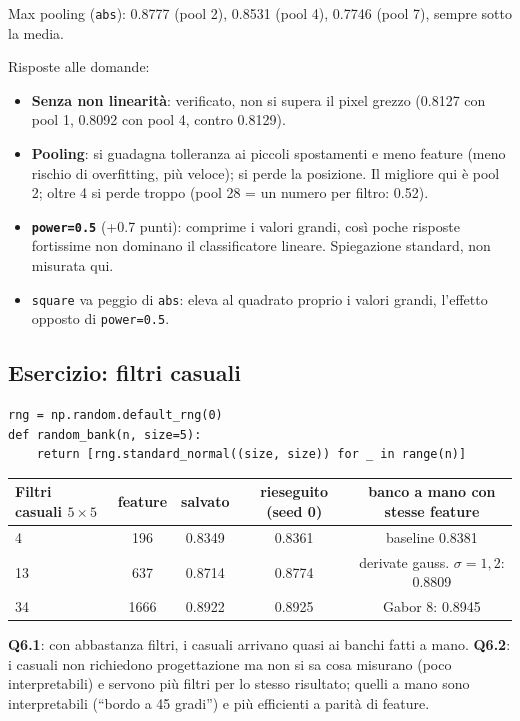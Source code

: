 \documentclass[11pt,a4paper]{article}
\newcommand{\code}[1]{\texttt{#1}}
\begin{document}
Max pooling (\code{abs}): 0.8777 (pool 2), 0.8531 (pool 4), 0.7746 (pool 7), sempre sotto la media.

Risposte alle domande:
\begin{itemize}
  \item \textbf{Senza non linearità}: verificato, non si supera il pixel grezzo (0.8127 con pool 1, 0.8092 con pool 4, contro 0.8129).
  \item \textbf{Pooling}: si guadagna tolleranza ai piccoli spostamenti e meno feature (meno rischio di overfitting, più veloce); si perde la posizione. Il migliore qui è pool 2; oltre 4 si perde troppo (pool 28 = un numero per filtro: 0.52).
  \item \textbf{\code{power=0.5}} (+0.7 punti): comprime i valori grandi, così poche risposte fortissime non dominano il classificatore lineare. Spiegazione standard, non misurata qui.
  \item \code{square} va peggio di \code{abs}: eleva al quadrato proprio i valori grandi, l'effetto opposto di \code{power=0.5}.
\end{itemize}

\subsection{Esercizio: filtri casuali}

\begin{soluzione}
\begin{Verbatim}
rng = np.random.default_rng(0)
def random_bank(n, size=5):
    return [rng.standard_normal((size, size)) for _ in range(n)]
\end{Verbatim}
\end{soluzione}

\begin{center}
\begin{tabular}{@{}lcccc@{}}
\toprule
Filtri casuali $5 \times 5$ & feature & salvato & rieseguito (seed 0) & banco a mano con stesse feature \\
\midrule
4 & 196 & 0.8349 & 0.8361 & baseline 0.8381 \\
13 & 637 & 0.8714 & 0.8774 & derivate gauss. $\sigma = 1,2$: 0.8809 \\
34 & 1666 & 0.8922 & 0.8925 & Gabor 8: 0.8945 \\
\bottomrule
\end{tabular}
\end{center}

\textbf{Q6.1}: con abbastanza filtri, i casuali arrivano quasi ai banchi fatti a mano. \textbf{Q6.2}: i casuali non richiedono progettazione ma non si sa cosa misurano (poco interpretabili) e servono più filtri per lo stesso risultato; quelli a mano sono interpretabili (``bordo a 45 gradi'') e più efficienti a parità di feature.
\end{document}
